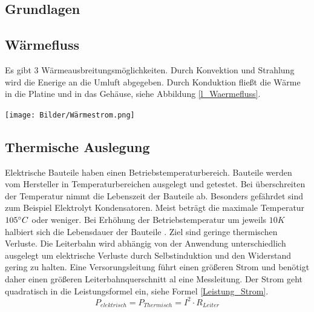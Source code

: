 \documentclass[10pt,a4paper,oneside,abstracton]{scrartcl}
\newenvironment{Figure}
  {\par\medskip\noindent\minipage{\linewidth}}
  {\endminipage\par\medskip}
\begin{document}
\begin{multicols}{2}
\section{Grundlagen}

\subsection{Wärmefluss}
Es gibt 3 Wärmeausbreitungsmöglichkeiten.  
Durch Konvektion und Strahlung wird die Enerige an die Umluft abgegeben.
Durch Konduktion fließt die Wärme in die Platine und in das Gehäuse, siehe Abbildung \ref*{l_Waermefluss}.

\begin{Figure}
	\texttt{[image: Bilder/Wärmestrom.png]}
	\label{l_Waermefluss}
\end{Figure}

\subsection{Thermische Auslegung}
Elektrische Bauteile haben einen Betriebstemperaturbereich. 
Bauteile werden vom Hersteller in Temperaturbereichen ausgelegt und getestet. 
Bei überschreiten der Temperatur nimmt die Lebenszeit der Bauteile ab. 
Besonders gefährdet sind zum Beispiel Elektrolyt Kondensatoren. 
Meist beträgt die maximale Temperatur $ 105 \degree C $ oder weniger. \newline 
Bei Erhöhung der Betriebstemperatur um jeweils $ 10K $ halbiert sich die Lebensdauer der Bauteile \cite{Elko}.
\newline
Ziel sind geringe thermischen Verluste. 
Die Leiterbahn wird abhängig von der Anwendung unterschiedlich ausgelegt um 
elektrische Verluste durch Selbstinduktion und den Widerstand gering zu halten. 
\newline
Eine Versorungsleitung führt einen größeren Strom und benötigt daher einen größeren Leiterbahnquerschnitt al eine Messleitung.
Der Strom geht quadratisch in die Leistungsformel ein, siehe Formel \ref*{Leistung_Strom}. 
\begin{equation}
	P_{elektrisch} = P_{Thermisch} =  I^2 \cdot R_{Leiter} 
	\label{Leistung_Strom}
\end{equation}


\end{multicols}
\end{document}
